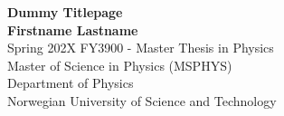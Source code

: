 \begin{titlepage}
	\begin{center}
		\vspace*{1cm}
		\Huge
		\textbf{Dummy Titlepage}\\

		\large
		\vspace{1.5cm}
		\textbf{Firstname Lastname}\\
		\vspace{0.5cm}
		Spring 202X
		\vspace{0.5cm}
		\vfill
		FY3900 - Master Thesis in Physics\\[0.4cm]
		Master of Science in Physics (MSPHYS) \\[0.3cm]
		Department of Physics  \\[0.3cm]
		Norwegian University of Science and Technology
	\end{center}
\end{titlepage}
\thispagestyle{empty}
\cleardoublepage